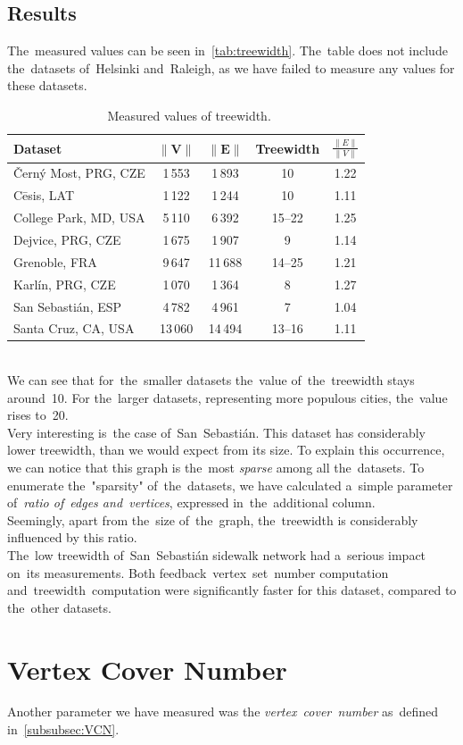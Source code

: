 \subsection{Results}
The~measured values can be seen in~\autoref{tab:treewidth}. The~table does not include the~datasets of~Helsinki and~Raleigh, as we have failed to measure any values for these datasets.
\begin{table}[h!]
\centering
\caption[Measured values of treewidth]{~Measured values of treewidth.}\label{tab:treewidth}
\begin{tabular}{l|c|c|c|c}
	\textbf{Dataset}		& $\|\mathbf{V}\|$		& $\|\mathbf{E}\|$& \textbf{Treewidth}   & \textbf{$\frac{\|E\|}{\|V\|}$}\tabularnewline \hline \hline
 	Černý Most, PRG, CZE & 1\,553	& 1\,893 & 10 & 1.22\tabularnewline \hline
 	Cēsis, LAT	& 1\,122	& 1\,244	& 10 & 1.11 \tabularnewline \hline
 	College Park, MD, USA & 5\,110 & 6\,392 & 15--22 & 1.25	\tabularnewline \hline
 	Dejvice, PRG, CZE & 1\,675 & 1\,907 & 9 & 1.14	\tabularnewline \hline
 	Grenoble, FRA & 9\,647 & 11\,688 & 14--25 & 1.21 \tabularnewline \hline
 	Karlín, PRG, CZE & 1\,070 & 1\,364 & 8 & 1.27	\tabularnewline \hline
 	San Sebastián, ESP & 4\,782 & 4\,961 & 7 & 1.04 \tabularnewline \hline
 	Santa Cruz, CA, USA & 13\,060 & 14\,494 & 13--16 & 1.11 \tabularnewline
\end{tabular}
\end{table}
\\
We can see that for~the~smaller datasets the~value of~the~treewidth stays around~10. For the~larger datasets, representing more populous cities, the~value rises to~20. \\
Very interesting is~the case of~San~Sebastián. This dataset has considerably lower treewidth, than we would expect from its size. To explain this occurrence, we can notice that this graph is the~most \textit{sparse} among all the~datasets. To enumerate the~"sparsity" of~the~datasets, we have calculated a~simple parameter of~\textit{ratio of~edges and~vertices}, expressed in~the~additional column. \\
Seemingly, apart from the~size of~the~graph, the~treewidth is considerably influenced by this ratio. \\
The~low treewidth of~San~Sebastián sidewalk network had a~serious impact on~its measurements. Both feedback~vertex~set~number computation and~treewidth~computation were significantly faster for this dataset, compared to the~other datasets.
\section{Vertex Cover Number}
Another parameter we have measured was the \textit{vertex~cover~number} as~defined in~\autoref{subsubsec:VCN}. 
